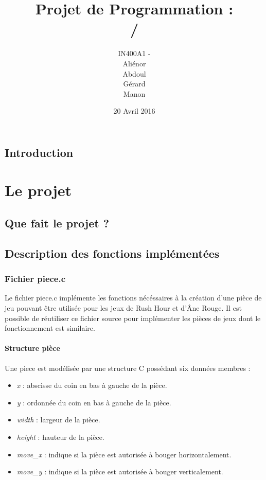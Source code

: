 \documentclass{report}
\title{Projet de Programmation :\\ \bsc{rush hour} / \bsc{âne rouge}}
\author{IN400A1 - \bsc{Groupe 6}\\Aliénor \bsc{brabant}\\Abdoul \bsc{diallo}\\Gérard \bsc{lézé}\\{Manon \bsc{philippot}}}
\date{20 Avril 2016}
\begin{document}
\maketitle
\tableofcontents

\chapter*{Introduction}

\part{Le projet}

\chapter{Que fait le projet ?}

\chapter{Description des fonctions implémentées}
\section{Fichier piece.c}
Le fichier piece.c implémente les fonctions nécéssaires à la création d'une pièce de jeu pouvant être utilisée pour les jeux de Rush Hour et d'Âne Rouge. Il est possible de réutiliser ce fichier source pour implémenter les pièces de jeux dont le fonctionnement est similaire.
\subsection{Structure pièce}
Une piece est modélisée par une structure C possédant six données membres :
\begin{itemize}
\item \emph{x} : abscisse du coin en bas à gauche de la pièce.
\item \emph{y} : ordonnée du coin en bas à gauche de la pièce.
\item \emph{width} : largeur de la pièce.
\item \emph{height} : hauteur de la pièce.
\item \emph{move\_x} : indique si la pièce est autorisée à bouger horizontalement.
\item \emph{move\_y} : indique si la pièce est autorisée à bouger verticalement.
\end{itemize}
\end{document}

